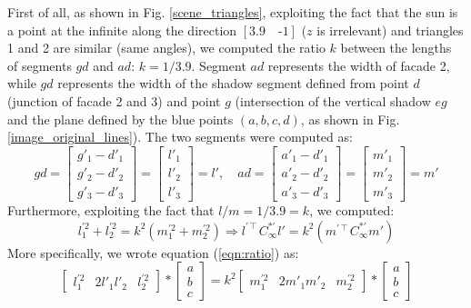 \documentclass[11pt, oneside]{article}
\begin{document}
First of all, as shown in Fig. \ref{scene_triangles}, exploiting the fact that the sun is a point at the infinite along the direction $[3.9\quad\text{-}1]$ ($z$ is irrelevant) and triangles 1 and 2 are similar (same angles), we computed the ratio $k$ between the lengths of segments $gd$ and $ad$: $k = 1/3.9$. Segment $ad$ represents the width of facade 2, while $gd$ represents the width of the shadow segment defined from point $d$ (junction of facade 2 and 3) and point $g$ (intersection of the vertical shadow $eg$ and the plane defined by the blue points $(a, b, c, d)$, as shown in Fig. \ref{image_original_lines}).
The two segments were computed as:
\begin{equation}
	gd = 
	\begin{bmatrix}
		g'_1 - d'_1 \\ g'_2 - d'_2 \\ g'_3 - d'_3
	\end{bmatrix}
	=
	\begin{bmatrix}
		l'_1 \\ l'_2 \\ l'_3
	\end{bmatrix}
	= l' , \quad
	ad = 
	\begin{bmatrix}
		a'_1 - d'_1 \\ a'_2 - d'_2 \\ a'_3 - d'_3
	\end{bmatrix}
	=
	\begin{bmatrix}
		m'_1 \\ m'_2 \\ m'_3
	\end{bmatrix}
	= m'
\end{equation}
Furthermore, exploiting the fact that $l/m = 1/3.9 = k$, we computed:
\begin{equation}
	\label{eqn:ratio}
	l_1^{'2} + l_2^{'2} = k^2 (m_1^{'2} + m_2^{'2})
	\Rightarrow
	l^{'\intercal} C^{*'}_\infty l' = k^2 (m^{'\intercal} C^{*'}_\infty m')
\end{equation}
More specifically, we wrote equation (\ref{eqn:ratio}) as:
\begin{equation}
	\begin{bmatrix}
		l_1^{'2} & 2 l'_1 l'_2 & l_2^{'2}
	\end{bmatrix}
	*
	\begin{bmatrix}
		a \\ b \\ c
	\end{bmatrix}
	= k^2
	\begin{bmatrix}
		m_1^{'2} & 2 m'_1 m'_2 & m_2^{'2}
	\end{bmatrix}
	*
	\begin{bmatrix}
		a \\ b \\ c
	\end{bmatrix}
\end{equation}
\end{document}
